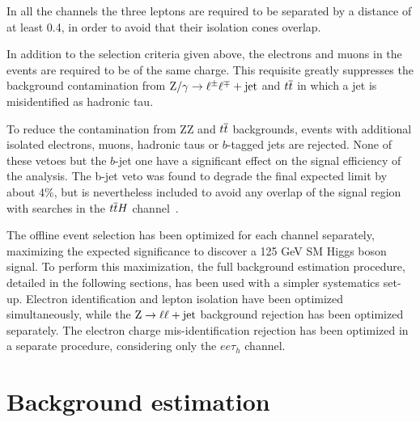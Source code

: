 In all the channels the three leptons are required to be separated by a \DR distance of at least 0.4, in order to avoid that their isolation cones overlap.

In addition to the selection criteria given above, the electrons and muons in the events are required to be of the same charge. This requisite greatly suppresses the background contamination from $\mathrm{Z}/\gamma \to \ell^\pm \ell^\mp + \mathrm{jet}$ and $t\overline{t}$ in which a jet is misidentified as hadronic tau.

To reduce the contamination from ZZ and $t\overline{t}$ backgrounds, events with additional isolated electrons, muons, hadronic taus or $b$-tagged jets are rejected. None of these vetoes but the $b$-jet one
have a significant effect on the signal efficiency of the analysis. The b-jet veto was found to degrade the final expected limit by about 4\%, but is nevertheless included to avoid any overlap of the
signal region with searches in the $t\overline{t}H$ channel~\cite{CMS-PAS-HIG-13-019}.

The offline event selection has been optimized for each channel separately, maximizing the expected significance to discover a 125 GeV SM Higgs boson signal. To perform this maximization, the full background estimation procedure, detailed in the following sections, has been used with a simpler systematics set-up. Electron identification and lepton isolation have been optimized simultaneously, while the $\mathrm{Z}\rightarrow\ell\ell+\mathrm{jet}$ background rejection has been optimized separately. The electron charge mis-identification rejection has been optimized in a separate procedure, considering only the $ee\tau_h$ channel.

\section{Background estimation}


